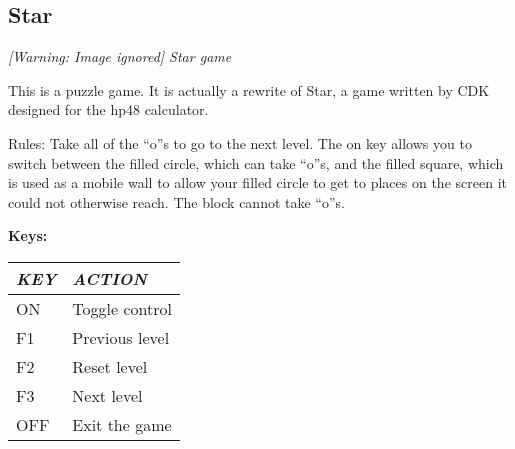 \subsection{Star}
{\centering\itshape
  [Warning: Image ignored] %
 \newline
Star game
\par}

This is a puzzle game.  It is actually a rewrite of Star, a game written
by CDK designed for the hp48 calculator.

Rules: Take all of the ``o''s to go to the
next level.  The on key allows you to switch between the filled circle,
which can take ``o''s, and the filled square, which is used as a mobile
wall to allow your filled circle to get to places on the screen it
could not otherwise reach. The block cannot take ``o''s.

{\bfseries
Keys:}

\begin{center}\begin{tabular}{|p{4.7780004cm}|p{4.321cm}|}
\hline
{\centering\bfseries\itshape
KEY
\par}
&
{\centering\bfseries\itshape
ACTION
\par}
\\\hline
{\centering
ON
\par}
&
Toggle control
\\\hline
{\centering
F1
\par}
&
Previous level
\\\hline
{\centering
F2
\par}
&
Reset level
\\\hline
{\centering
F3
\par}
&
Next level
\\\hline
{\centering
OFF
\par}
&
Exit the game
\\\hline
\end{tabular}\end{center}


